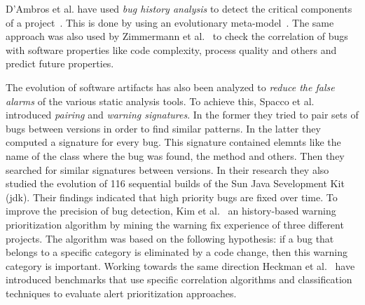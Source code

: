 \documentclass[conference]{llncs}
\begin{document}
D'Ambros et al. have used {\it bug history analysis} to detect
the critical components of a project~\cite{D08}. This is done by using an
evolutionary meta-model~\cite{DL08}. The same approach was
also used by Zimmermann et al.~\cite{ZNA08} to check the correlation
of bugs with software properties like code complexity, process quality and others
and predict future properties.

The evolution of software artifacts has also been analyzed to {\it reduce the false
alarms} of the various static analysis tools. To achieve this, Spacco et
al.~\cite{SHP06} introduced {\it pairing} and {\it warning signatures}. In the
former they tried to pair sets of bugs between versions in order to find
similar patterns. In the latter they computed a signature for every bug. This
signature contained elemnts like the name of the class where the bug was found,
the method and others. Then they searched for similar signatures between
versions. In their research they also studied the evolution of 116 sequential
builds of the Sun Java Sevelopment Kit ({\sc jdk}). Their findings indicated that
high priority bugs are fixed over time. To improve the precision of bug
detection, Kim et al.~\cite{KE07b}\cite{KE07} an history-based warning
prioritization algorithm by mining the warning fix experience of three
different projects. The algorithm was based on the following hypothesis: if a
bug that belongs to a specific category is eliminated by a code change, then
this warning category is important. Working towards the same direction Heckman
et al.~\cite{HW09}\cite{HW08} have introduced benchmarks that use specific
correlation algorithms and classification techniques to evaluate alert
prioritization approaches.
\end{document}
